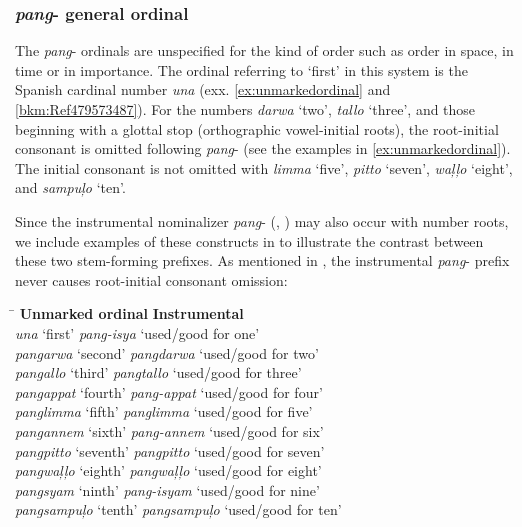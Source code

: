 \subsubsection{\textit{pang}{}- general ordinal}
\label{sec:generalordinalnumbers}

The \textit{pang}{}- ordinals are unspecified for the kind of order such as order in space, in time or in importance. The ordinal referring to ‘first’ in this system is the Spanish cardinal number \textit{una} (exx. \ref{ex:unmarkedordinal} and \ref{bkm:Ref479573487}). For the numbers \textit{darwa} ‘two’, \textit{tallo} ‘three’, and those beginning with a glottal stop (orthographic vowel-initial roots), the root-initial consonant is omitted following \textit{pang}{}- (see the examples in \ref{ex:unmarkedordinal}). The initial consonant is not omitted with \textit{limma} ‘five’, \textit{pitto} ‘seven’, \textit{waļļo} ‘eight’, and \textit{sampuļo} ‘ten’.

Since the instrumental nominalizer \textit{pang}- (, ) may also occur with number roots, we include examples of these constructs in  to illustrate the contrast between these two stem-forming prefixes. As mentioned in , the instrumental \textit{pang}- prefix never causes root-initial consonant omission:

\ea
\label{ex:unmarkedordinal}
\begin{tabbing}
\hspace{4cm} \= \kill
\textbf{Unmarked ordinal} \> \textbf{Instrumental} \\
\textit{una} ‘first’ \> \textit{pang-isya} ‘used/good for one' \\
\textit{pangarwa}  ‘second’ \>  \textit{pangdarwa} ‘used/good for two' \\
\textit{pangallo}  ‘third’ \>   \textit{pangtallo} ‘used/good for three' \\ 
\textit{pangappat}  ‘fourth’ \>  \textit{pang-appat} ‘used/good for four' \\
\textit{panglimma}  ‘fifth’ \> \textit{panglimma} ‘used/good for five' \\ 
\textit{pangannem}  ‘sixth’ \> \textit{pang-annem} ‘used/good for six' \\
\textit{pangpitto}  ‘seventh’ \> \textit{pangpitto} ‘used/good for seven' \\
\textit{pangwaļļo}  ‘eighth’ \> \textit{pangwaļļo} ‘used/good for eight' \\
\textit{pangsyam}  ‘ninth’ \> \textit{pang-isyam} ‘used/good for nine' \\
\textit{pangsampuļo}  ‘tenth’ \> \textit{pangsampuļo} ‘used/good for ten'
\end{tabbing}
\z


